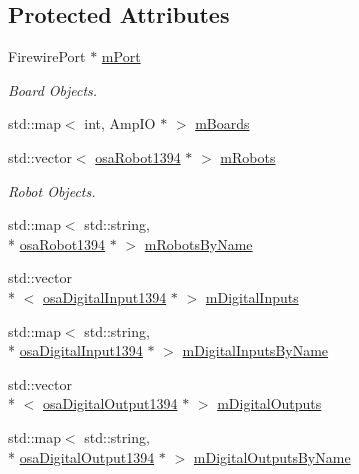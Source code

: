 \subsection*{Protected Attributes}
\begin{DoxyCompactItemize}
\item 
Firewire\-Port $\ast$ \hyperlink{classsaw_robot_i_o1394_1_1osa_port1394_aa0d8a2385466f6861d9b999f2c73406c}{m\-Port}
\begin{DoxyCompactList}\small\item\em Board Objects. \end{DoxyCompactList}\item 
std\-::map$<$ int, Amp\-I\-O $\ast$ $>$ \hyperlink{classsaw_robot_i_o1394_1_1osa_port1394_ad9af20aea070a26638199c54a9bc1d83}{m\-Boards}
\item 
std\-::vector$<$ \hyperlink{classsaw_robot_i_o1394_1_1osa_robot1394}{osa\-Robot1394} $\ast$ $>$ \hyperlink{classsaw_robot_i_o1394_1_1osa_port1394_a3cb60cf6a18b8e0b91576636cb231ea3}{m\-Robots}
\begin{DoxyCompactList}\small\item\em Robot Objects. \end{DoxyCompactList}\item 
std\-::map$<$ std\-::string, \\*
\hyperlink{classsaw_robot_i_o1394_1_1osa_robot1394}{osa\-Robot1394} $\ast$ $>$ \hyperlink{classsaw_robot_i_o1394_1_1osa_port1394_a43429f6b99e3a27ba60a626d3ab83367}{m\-Robots\-By\-Name}
\item 
std\-::vector\\*
$<$ \hyperlink{classsaw_robot_i_o1394_1_1osa_digital_input1394}{osa\-Digital\-Input1394} $\ast$ $>$ \hyperlink{classsaw_robot_i_o1394_1_1osa_port1394_ad654d5d0706677161e40b7eb723ed976}{m\-Digital\-Inputs}
\item 
std\-::map$<$ std\-::string, \\*
\hyperlink{classsaw_robot_i_o1394_1_1osa_digital_input1394}{osa\-Digital\-Input1394} $\ast$ $>$ \hyperlink{classsaw_robot_i_o1394_1_1osa_port1394_a02b4d9862a4db5568382fc665d365820}{m\-Digital\-Inputs\-By\-Name}
\item 
std\-::vector\\*
$<$ \hyperlink{classsaw_robot_i_o1394_1_1osa_digital_output1394}{osa\-Digital\-Output1394} $\ast$ $>$ \hyperlink{classsaw_robot_i_o1394_1_1osa_port1394_a247c020e8029738677fa7d4f788ff084}{m\-Digital\-Outputs}
\item 
std\-::map$<$ std\-::string, \\*
\hyperlink{classsaw_robot_i_o1394_1_1osa_digital_output1394}{osa\-Digital\-Output1394} $\ast$ $>$ \hyperlink{classsaw_robot_i_o1394_1_1osa_port1394_a94c76312e64027780e81d04c88c70817}{m\-Digital\-Outputs\-By\-Name}
\end{DoxyCompactItemize}


